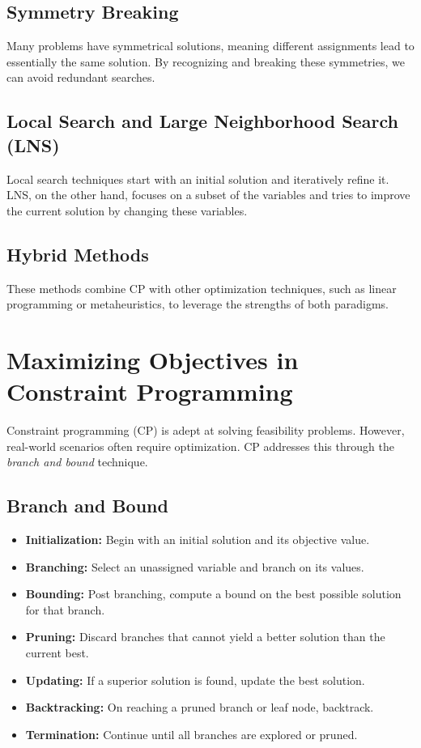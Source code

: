 \subsection{Symmetry Breaking}

Many problems have symmetrical solutions, meaning different assignments lead to essentially the same solution. By recognizing and breaking these symmetries, we can avoid redundant searches.

\subsection{Local Search and Large Neighborhood Search (LNS)}

Local search techniques start with an initial solution and iteratively refine it. LNS, on the other hand, focuses on a subset of the variables and tries to improve the current solution by changing these variables.

\subsection{Hybrid Methods}

These methods combine CP with other optimization techniques, such as linear programming or metaheuristics, to leverage the strengths of both paradigms.

\section{Maximizing Objectives in Constraint Programming}

Constraint programming (CP) is adept at solving feasibility problems. However, real-world scenarios often require optimization. CP addresses this through the \textit{branch and bound} technique.

\subsection{Branch and Bound}

\begin{itemize}
    \item \textbf{Initialization:} Begin with an initial solution and its objective value.
    \item \textbf{Branching:} Select an unassigned variable and branch on its values.
    \item \textbf{Bounding:} Post branching, compute a bound on the best possible solution for that branch.
    \item \textbf{Pruning:} Discard branches that cannot yield a better solution than the current best.
    \item \textbf{Updating:} If a superior solution is found, update the best solution.
    \item \textbf{Backtracking:} On reaching a pruned branch or leaf node, backtrack.
    \item \textbf{Termination:} Continue until all branches are explored or pruned.
\end{itemize}

